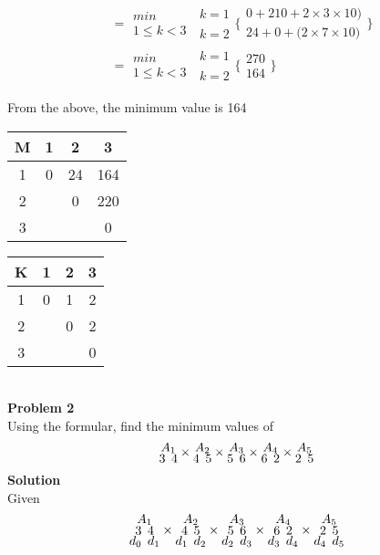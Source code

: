 \documentclass[12pt]{report}
\begin{document}
\begin{enumerate}
\begin{align*}
		&= \substack{min\\{1\le k < 3}}\substack{~k=1\\\\~k=2}\bigg\{\substack{{0 + 210 + 2 \times 3\times 10)}\\{24 + 0 + (2 \times 7\times 10})}\bigg\}\\
		&= \substack{min\\{1\le k < 3}}\substack{~k=1 \\\\~k=2}\bigg\{\substack{270\\164}\bigg\}
	\end{align*}
\end{enumerate}
From the above, the minimum value is 164
\begin{table}[h]
	\begin{tabular}{c|c|c|c|}
		M&1&2&3\\\hline
		1&0&24&164\\\hline
		2&&0&220\\\hline
		3&&&0\\\hline
	\end{tabular}
	\qquad
	\begin{tabular}{c|c|c|c|}
		K&1&2&3\\\hline
		1&0&1&2\\\hline
		2&&0&2\\\hline
		3&&&0\\\hline
	\end{tabular}
\end{table}\\
\textbf{Problem 2}\\
Using the formular, find the minimum values of
\begin{align*}
	\Large\substack{A_1\\{3 ~ 4}}\times \substack{A_2\\{4 ~ 5}}\times \substack{A_3\\{5 ~ 6}}\times \substack{A_4\\{6 ~ 2}}\times \substack{A_5\\{2 ~ 5}}
\end{align*}
\textbf{Solution}\\
Given 
\begin{align*}
	\Large\substack{A_1\\{3 ~ 4}\\{d_0 ~ d_1}}\times \substack{A_2\\{4 ~ 5}\\{d_1 ~ d_2}}\times \substack{A_3\\{5 ~ 6}\\{d_2 ~ d_3}}\times \substack{A_4\\{6 ~ 2}\\{d_3 ~ d_4}}\times \substack{A_5\\{2 ~ 5}\\{d_4 ~ d_5}}
\end{align*}
\end{document}
